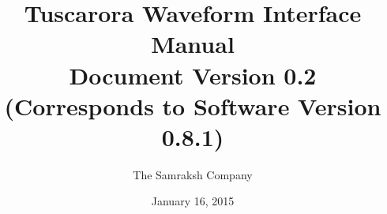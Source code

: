 \documentclass[letterpaper,
 11pt,
 titlepage,
 pdftex,
 twoside=false,
 openany,			%
 headinclude,    %
 appendixprefix=true,
 chapterprefix=false,   
 index= totoc,        %
 bibliography=openstyle,
 bibliography    = totoc         %
]{article}
\begin{document}
\begin{titlepage}
\title{
{\Huge Tuscarora Waveform Interface Manual}\\
Document Version 0.2 \\
(Corresponds to Software Version 0.8.1)
}
\author{The Samraksh Company}
\date{January 16, 2015}
\end{titlepage}

\maketitle
\tableofcontents{}

\newpage


%
%
\end{document}
